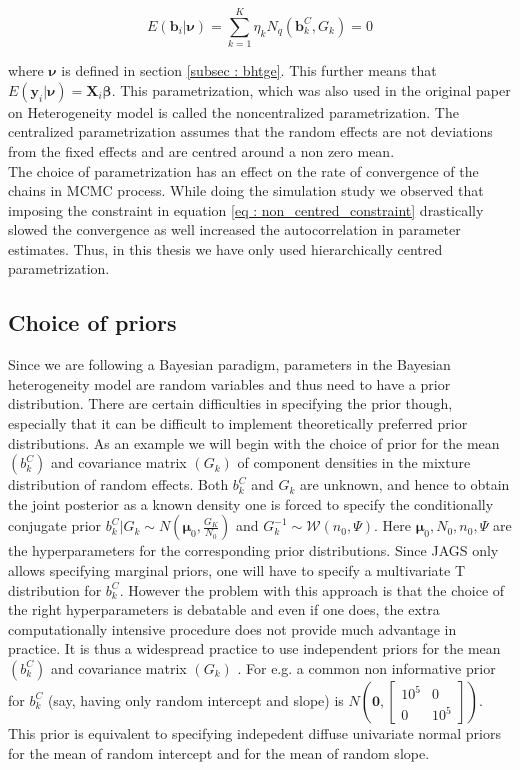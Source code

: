 \begin{equation}
\label{eq : non_centred_constraint}
E(\boldsymbol{b}_i | \boldsymbol{\nu}) = \sum_{k=1}^{K} \eta_k N_q(\boldsymbol{b}_k^C, G_k) = 0
\end{equation}

where $\boldsymbol{\nu}$ is defined in section \ref{subsec : bhtge}. This further means that $E(\boldsymbol{y}_i | \boldsymbol{\nu}) = \boldsymbol{X}_{i}\boldsymbol{\beta}$. This parametrization, which was also used in the original paper on Heterogeneity model \citep{verbeke_linear_1996} is called the noncentralized parametrization. The centralized parametrization assumes that the random effects are not deviations from the fixed effects and are centred around a non zero mean.\\

The choice of parametrization has an effect on the rate of convergence of the chains in MCMC process. While doing the simulation study we observed that imposing the constraint in equation \ref{eq : non_centred_constraint} drastically slowed the convergence as well increased the autocorrelation in parameter estimates. Thus, in this thesis we have only used hierarchically centred parametrization.

\subsection{Choice of priors}
\label{subsec : choice_priors}
Since we are following a Bayesian paradigm, parameters in the Bayesian heterogeneity model are random variables and thus need to have a prior distribution. There are certain difficulties in specifying the prior though, especially that it can be difficult to implement theoretically preferred prior distributions. As an example we will begin with the choice of prior for the mean $(b_k^C)$ and covariance matrix $(G_k)$ of component densities in the mixture distribution of random effects. Both $b_k^C$ and $G_k$ are unknown, and hence to obtain the joint posterior as a known density one is forced to specify the conditionally conjugate prior $b_k^C | G_k \sim N(\boldsymbol{\mu}_0, \frac {G_K} {N_0})$ and $G_k^{-1} \sim \mathcal{W} (n_0, \Psi)$. Here $\boldsymbol{\mu}_0, N_0, n_0, \Psi$ are the hyperparameters for the corresponding prior distributions. Since JAGS only allows specifying marginal priors, one will have to specify a multivariate T distribution for $b_k^C$. However the problem with this approach is that the choice of the right hyperparameters is debatable \citep[pg. 192]{fruhwirth-schnatter_finite_2013} and even if one does, the extra computationally intensive procedure does not provide much advantage in practice. It is thus a widespread practice to use independent priors for the mean $(b_k^C)$ and covariance matrix $(G_k)$ \citep[chap. 17]{gelman_data_2006}. For e.g. a common non informative prior for $b_k^C$ (say, having only random intercept and slope) is $N(\boldsymbol{0}, \begin{bmatrix}10^5 & 0 \\ 0 & 10^5\end{bmatrix})$. This prior is equivalent to specifying indepedent diffuse univariate normal priors for the mean of random intercept and for the mean of random slope.


